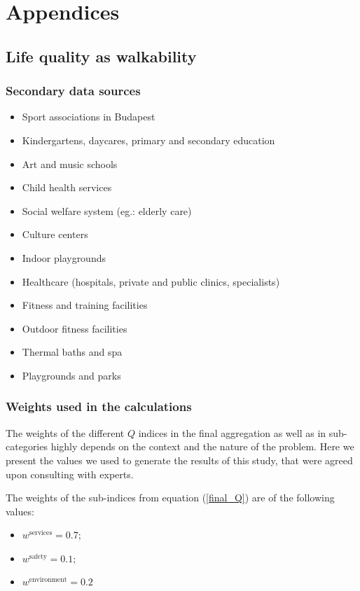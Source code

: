 \chapter{Appendices}

\section{Life quality as walkability}

\subsection{Secondary data sources}
\label{SI:walkabilityData}
\begin{itemize}
  \item {Sport associations in Budapest}~\cite{HU_sport}
  \item {Kindergartens, daycares, primary and secondary education}~\cite{HU_Edu}
  \item {Art and music schools}~\cite{HU_Art}
  \item {Child health services}~\cite{HU_Child}
  \item {Social welfare system (eg.: elderly care)}~\cite{HU_Social}
  \item {Culture centers}~\cite{HU_Cult}
  \item {Indoor playgrounds}~\cite{HU_Play}
  \item {Healthcare (hospitals, private and public clinics, specialists)}~\cite{HU_Health}
  \item {Fitness and training facilities}~\cite{HU_Fitness}
  \item {Outdoor fitness facilities}~\cite{HU_outfitness}
  \item {Thermal baths and spa}~\cite{HU_Thermal}
  \item {Playgrounds and parks}~\cite{HU_Park}
\end{itemize}

\subsection{Weights used in the calculations}
The weights of the different $Q$ indices in the final aggregation as well as in sub-categories highly depends on the context and the nature of the problem. Here we present the values we used to generate the results of this study, that were agreed upon consulting with experts.

The weights of the sub-indices from equation (\ref{final_Q}) are of the following values:
\begin{itemize}
  \item $w^{\text{services}}=0.7$;
  \item $w^{\text{safety}}=0.1$;
  \item $w^{\text{environment}}=0.2$
\end{itemize}

